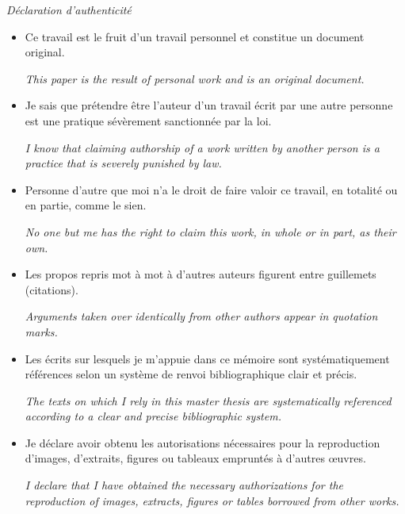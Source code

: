 \documentclass[
11pt, %
oneside, %
french, %
onehalfspacing, %
liststotoc, %
headsepline, %
chapterinoneline, %
]{MastersDoctoralThesis} %
\begin{document}

\begin{center}
	{\normalsize \MakeUppercase{\univname} \par}%
			\bigskip
	{\huge\textit{Déclaration d'authenticité} \par}
			\bigskip
	{\normalsize \facname \par}%
			\bigskip
	{\normalsize \degreename\par}%
			\bigskip
	{\normalsize\bfseries \ttitle \par}%
			\bigskip
	{\normalsize \byname{} \authorname \par}%
			\bigskip
\end{center}

\begin{itemize} 
\item Ce travail est le fruit d’un travail personnel et constitue un document original.
	
\textit{This paper is the result of personal work and is an original document.}
\item Je sais que prétendre être l’auteur d’un travail écrit par une autre personne est une pratique sévèrement sanctionnée par la loi.

\textit{I know that claiming authorship of a work written by another person is a practice that is severely punished by law.}
\item Personne d’autre que moi n’a le droit de faire valoir ce travail, en totalité ou en partie, comme le sien.

\textit{No one but me has the right to claim this work, in whole or in part, as their own.}
\item Les propos repris mot à mot à d’autres auteurs figurent entre guillemets (citations).

\textit{Arguments taken over identically from other authors appear in quotation marks.}
\item Les écrits sur lesquels je m’appuie dans ce mémoire sont systématiquement références selon un système de renvoi bibliographique clair et précis.

\textit{The texts on which I rely in this master thesis are systematically referenced according to a clear and precise bibliographic system.}
\item Je déclare avoir obtenu les autorisations nécessaires pour la reproduction d’images, d’extraits, figures ou tableaux empruntés à d’autres œuvres.

\textit{I declare that I have obtained the necessary authorizations for the reproduction of images, extracts, figures or tables borrowed from other works.}\\
\end{itemize}
\end{document}
